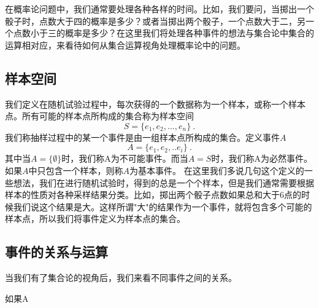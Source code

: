 在概率论问题中，我们通常要处理各种各样的时间。比如，我们要问，当掷出一个骰子时，点数大于四的概率是多少？或者当掷出两个骰子，一个点数大于二，另一个点数小于三的概率是多少？在这里我们将处理各种事件的想法与集合论中集合的运算相对应，来看待如何从集合运算视角处理概率论中的问题。
\subsection{样本空间}
我们定义在随机试验过程中，每次获得的一个数据称为一个样本，或称一个样本点。所有可能的样本点所构成的集合称为样本空间
\begin{equation}
S = \{e_1,e_2,...,e_n\}~.
\end{equation}
我们称抽样过程中的某一个事件是由一组样本点所构成的集合。定义事件$A$
\begin{equation}
A = \{e_1,e_2,..e_i\}~.
\end{equation}
其中当$A=\{\emptyset\}$时，我们称A为不可能事件。而当$A=S$时，我们称A为必然事件。如果$A$中只包含一个样本，则称$A$为基本事件。
在这里我们多说几句这个定义的一些想法，我们在进行随机试验时，得到的总是一个个样本，但是我们通常需要根据样本的性质对各种采样结果分类。比如，掷出两个骰子点数如果总和大于6点的时候我们说这个结果是大。这样所谓"大"的结果作为一个事件，就将包含多个可能的样本点，所以我们将事件定义为样本点的集合。
\subsection{事件的关系与运算}
当我们有了集合论的视角后，我们来看不同事件之间的关系。
\item 如果A

